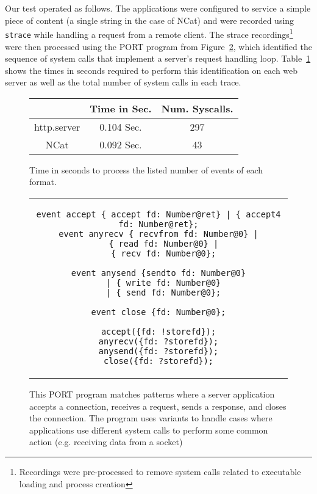 Our test operated as follows.  The applications were configured to service
a simple piece of content (a single string in the case of NCat) and were
recorded using {\tt strace} while handling a request from a remote client.
The strace
recordings\footnote{Recordings were pre-processed to remove system calls
related to executable loading and process creation} were then processed using the PORT program from
Figure~\ref{lst:RealWorldPerformance},  which
identified the sequence of system calls that implement
a server's request handling
loop.  Table~\ref{tbl:RealWorldPerformance}
shows the times in seconds required to perform this identification on each
web server as well as the total number of system calls in each trace.

\begin{figure}
  \begin{tabular}{|c|c|c}
                & Time in Sec. & Num. Syscalls.\\
              \hline
  http.server   & 0.104 Sec.   & 297   \\
  NCat          & 0.092 Sec.   & 43      \\
\end{tabular}
\caption{Time in seconds to process the listed number of events of each format.}
\label{tbl:RealWorldPerformance}
\end{figure}

\begin{figure}[H]
\centering
\begin{tabular}{c}
\begin{lstlisting}
event accept { accept fd: Number@ret} | { accept4 fd: Number@ret};
event anyrecv { recvfrom fd: Number@0} |
  { read fd: Number@0} |
  { recv fd: Number@0};

event anysend {sendto fd: Number@0}
  | { write fd: Number@0}
  | { send fd: Number@0};

event close {fd: Number@0};

accept({fd: !storefd});
anyrecv({fd: ?storefd});
anysend({fd: ?storefd});
close({fd: ?storefd});
\end{lstlisting}
\end{tabular}
\caption{This PORT program matches patterns where a server application
  accepts a connection, receives a request, sends a response, and closes
  the connection.  The program uses variants to handle cases where
  applications use different system calls to perform some common action
  (e.g. receiving data from a socket)}
\label{lst:RealWorldPerformance}
\end{figure}

